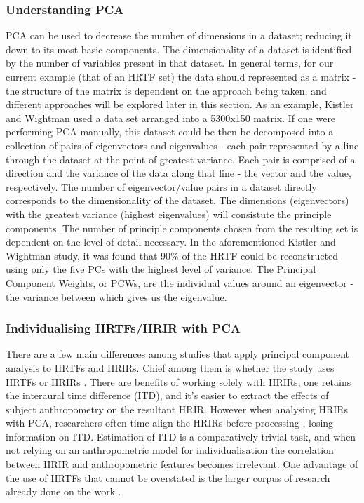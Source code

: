 \subsubsection{Understanding PCA}
PCA can be used to decrease the number of dimensions in a dataset; reducing it down to its most basic components. The dimensionality of a dataset is identified by the number of variables present in that dataset. In general terms, for our current example (that of an HRTF set) the data should represented as a matrix - the structure of the matrix is dependent on the approach being taken, and different approaches will be explored later in this section. As an example, Kistler and Wightman \citep{Kistler1992} used a data set arranged into a 5300x150 matrix. If one were performing PCA manually, this dataset could be then be decomposed into a collection of pairs of eigenvectors and eigenvalues - each pair represented by a line through the dataset at the point of greatest variance. Each pair is comprised of a direction and the variance of the data along that line - the vector and the value, respectively. The number of eigenvector/value pairs in a dataset directly corresponds to the dimensionality of the dataset. The dimensions (eigenvectors) with the greatest variance (highest eigenvalues) will consistute the principle components. The number of principle components chosen from the resulting set is dependent on the level of detail necessary. In the aforementioned Kistler and Wightman study, it was found that 90\% of the HRTF could be reconstructed using only the five PCs with the highest level of variance. The Principal Component Weights, or PCWs, are the individual values around an eigenvector - the variance between which gives us the eigenvalue.


\subsubsection{Individualising HRTFs/HRIR with PCA}
There are a few main differences among studies that apply principal component analysis to HRTFs and HRIRs. Chief among them is whether the study uses HRTFs \citep{Holzl2014a} \citep{gutierrezparera2017} or HRIRs \citep{Hwang2008} \citep{Hwang2007} \citep{Fink2012}. There are benefits of working solely with HRIRs, one retains the interaural time difference (ITD), and it's easier to extract the effects of subject anthropometry on the resultant HRIR. However when analysing HRIRs with PCA, researchers often time-align the HRIRs before processing \citep{hwang2010customization}, losing information on ITD. Estimation of ITD is a comparatively trivial task, and when not relying on an anthropometric model for individualisation the correlation between HRIR and anthropometric features becomes irrelevant. One advantage of the use of HRTFs that cannot be overstated is the larger corpus of research already done on the work \citep{Holzl2014a}. 

